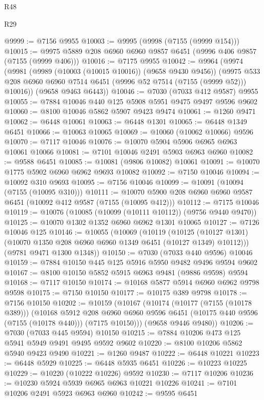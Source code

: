 \begin{lexlean}{R48}
\begin{lexlean}{R29}
\begin{coremodule}
{{{{{{{{{{{{{{{{{{{{{{{{{{{{{{{{{{{{{{{{{{{{{{{{{{{{{{{{{{{{{{{{{{{{{{{{{{{{{{{{{{{{{{{{{{{{{{{{{{{{{{{{{{{{{{{{{{{{{{{{{{{{{{{{{{{{{{{{{{{{{{{{{{{{{{{{{{{{{{{{{{{{{{{{{{{{{{{{{{{{{{{{{{{{{{{{{{{{{{{{{{{{{{{{{{{{{{{{{{@9999 := @7156 @9955
@10003 := @9995 (@9998 (@7155 (@9999 @154)))
@10015 := @9975 @5889 @208 @6960 @6960 @9857 @6451 (@9996 @406 @9857 (@7155 (@9999 @406)))
@10016 := @7175 @9955
@10042 := @9964
    (@9974
      (@9981
        (@9989 (@10003 (@10015 @10016)) (@9658 @9430 @9456))
        (@9975 @533 @208 @6960 @6960 @7514 @6451 (@9996 @52 @7514 (@7155 (@9999 @52))) @10016))
      (@9658 @9463 @6443))
@10046 := @7030 (@7033 @412 @9587) @9955
@10055 := @7884 @10046 @440 @125 @5908 @5951 @9475 @9497 @9596 @9602
@10060 := @8100 @10046 @5862 @5907 @9423 @9474
@10061 := @1260 @9471
@10062 := @6448 @10061
@10063 := @6448 @1301
@10065 := @6448 @1349 @6451
@10066 := @10063 @10065
@10069 := @10060 (@10062 @10066) @9596
@10070 := @7117 @10046
@10076 := @10070 @5904 @5906 @6965 @6963 @10061 @10066
@10081 := @7101 @10046 @2491 @5903 @6963 @6960
@10082 := @9588 @6451
@10085 := @10081 (@9806 @10082) @10061
@10091 := @10070 @1775 @5902 @6960 @6962 @9693 @10082
@10092 := @7150 @10046
@10094 := @10092 @310 @9693
@10095 := @7156 @10046
@10099 := @10091 (@10094 (@7155 (@10095 @310)))
@10111 := @10070 @5900 @208 @6960 @6960 @9587 @6451 (@10092 @412 @9587 (@7155 (@10095 @412)))
@10112 := @7175 @10046
@10119 := @10076 (@10085 (@10099 (@10111 @10112)) (@9756 @9440 @9470))
@10125 := @10070 @1302 @1352 @6960 @6962 @1301 @10065
@10127 := @7126 @10046 @125
@10146 := @10055
    (@10069
      (@10119
        (@10125 (@10127 @1301) (@10070 @1350 @208 @6960 @6960 @1349 @6451 (@10127 @1349) @10112)))
      (@9781 @9471 @1300 @1348))
@10150 := @7030 (@7033 @440 @9596) @10046
@10159 := @7884 @10150 @445 @125 @5916 @5950 @9482 @9496 @9594 @9602
@10167 := @8100 @10150 @5852 @5915 @6963 @9481 (@9886 @9598) @9594
@10168 := @7117 @10150
@10174 := @10168 @5877 @5914 @6960 @6962 @9798 @9598
@10175 := @7150 @10150
@10177 := @10175 @389 @9798
@10178 := @7156 @10150
@10202 := @10159
    (@10167
      (@10174
        (@10177 (@7155 (@10178 @389)))
        (@10168
          @5912
          @208
          @6960
          @6960
          @9596
          @6451
          (@10175 @440 @9596 (@7155 (@10178 @440)))
          (@7175 @10150)))
      (@9658 @9446 @9480))
@10206 := @7030 (@7033 @445 @9594) @10150
@10215 := @7884 @10206 @473 @125 @5941 @5949 @9491 @9495 @9592 @9602
@10220 := @8100 @10206 @5862 @5940 @9423 @9490
@10221 := @1260 @9487
@10222 := @6448 @10221
@10223 := @6448 @5929
@10225 := @6448 @5935 @6451
@10226 := @10223 @10225
@10229 := @10220 (@10222 @10226) @9592
@10230 := @7117 @10206
@10236 := @10230 @5924 @5939 @6965 @6963 @10221 @10226
@10241 := @7101 @10206 @2491 @5923 @6963 @6960
@10242 := @9595 @6451
}}}}}}}}}}}}}}}}}}}}}}}}}}}}}}}}}}}}}}}}}}}}}}}}}}}}}}}}}}}}}}}}}}}}}}}}}}}}}}}}}}}}}}}}}}}}}}}}}}}}}}}}}}}}}}}}}}}}}}}}}}}}}}}}}}}}}}}}}}}}}}}}}}}}}}}}}}}}}}}}}}}}}}}}}}}}}}}}}}}}}}}}}}}}}}}}}}}}}}}}}}}}}}}}}}}}}}}}}}
\end{coremodule}
\end{lexlean}
\end{lexlean}
